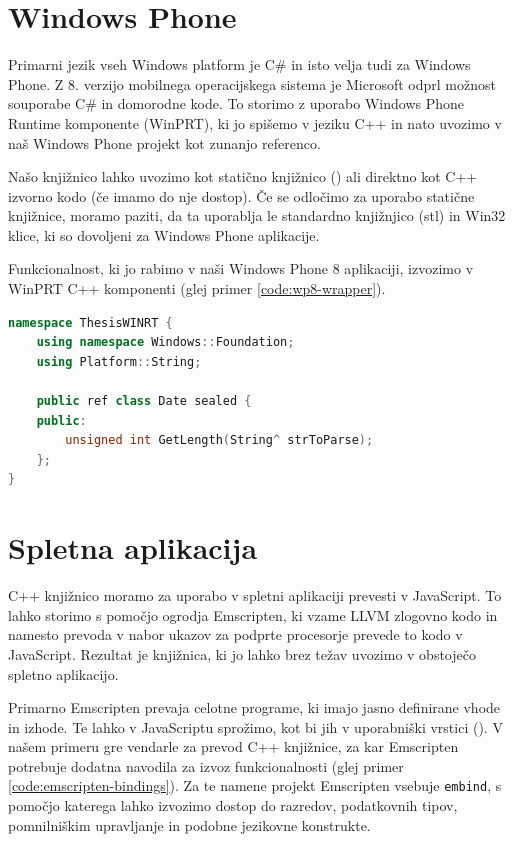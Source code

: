\section{Windows Phone}

Primarni jezik vseh Windows platform je C\# in isto velja tudi za Windows Phone. Z 8. verzijo mobilnega operacijskega sistema je Microsoft odprl možnost souporabe C\# in domorodne kode. To storimo z uporabo Windows Phone Runtime komponente (WinPRT), ki jo spišemo v jeziku C++ in nato uvozimo v naš Windows Phone projekt kot zunanjo referenco.

Našo knjižnico lahko uvozimo kot statično knjižnico () ali direktno kot C++ izvorno kodo (če imamo do nje dostop). Če se odločimo za uporabo statične knjižnice, moramo paziti, da ta uporablja le standardno knjižnjico (\gls{stl}) in Win32 klice, ki so dovoljeni za Windows Phone aplikacije\cite{windows-static}.

Funkcionalnost, ki jo rabimo v naši Windows Phone 8 aplikaciji, izvozimo v WinPRT C++ komponenti (glej primer \ref{code:wp8-wrapper}).

\lstset{language=[Sharp]C, breaklines}
\begin{lstlisting}[caption={C++ koda za izvoz funkcionalnosti knjižnice v JavaScript razreda \texttt{Date}.}, label=code:wp8-wrapper, language=c++]
namespace ThesisWINRT {
    using namespace Windows::Foundation;
    using Platform::String;

    public ref class Date sealed {
    public:
        unsigned int GetLength(String^ strToParse);
    };
}
\end{lstlisting}

\section{Spletna aplikacija}

C++ knjižnico moramo za uporabo v spletni aplikaciji prevesti v JavaScript. To lahko storimo s pomočjo ogrodja Emscripten, ki vzame LLVM zlogovno kodo in namesto prevoda v nabor ukazov za podprte procesorje prevede to kodo v JavaScript. Rezultat je knjižnica, ki jo lahko brez težav uvozimo v obstoječo spletno aplikacijo.

Primarno Emscripten prevaja celotne programe, ki imajo jasno definirane vhode in izhode. Te lahko v JavaScriptu sprožimo, kot bi jih v uporabniški vrstici (). V našem primeru gre vendarle za prevod C++ knjižnice, za kar Emscripten potrebuje dodatna navodila za izvoz funkcionalnosti (glej primer \ref{code:emscripten-bindings}). Za te namene projekt Emscripten vsebuje \texttt{embind}\cite{emscripten-embind}, s pomočjo katerega lahko izvozimo dostop do razredov, podatkovnih tipov, pomnilniškim upravljanje in podobne jezikovne konstrukte.

